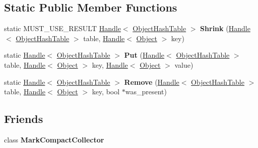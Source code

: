 \subsection*{Static Public Member Functions}
\begin{DoxyCompactItemize}
\item 
\hypertarget{classv8_1_1internal_1_1_object_hash_table_a63897a41f0ff1a796d4f136056a8af4b}{}static M\+U\+S\+T\+\_\+\+U\+S\+E\+\_\+\+R\+E\+S\+U\+L\+T \hyperlink{classv8_1_1internal_1_1_handle}{Handle}$<$ \hyperlink{classv8_1_1internal_1_1_object_hash_table}{Object\+Hash\+Table} $>$ {\bfseries Shrink} (\hyperlink{classv8_1_1internal_1_1_handle}{Handle}$<$ \hyperlink{classv8_1_1internal_1_1_object_hash_table}{Object\+Hash\+Table} $>$ table, \hyperlink{classv8_1_1internal_1_1_handle}{Handle}$<$ \hyperlink{classv8_1_1internal_1_1_object}{Object} $>$ key)\label{classv8_1_1internal_1_1_object_hash_table_a63897a41f0ff1a796d4f136056a8af4b}

\item 
\hypertarget{classv8_1_1internal_1_1_object_hash_table_ac9439aa9c8e36ffec62faea75de57535}{}static \hyperlink{classv8_1_1internal_1_1_handle}{Handle}$<$ \hyperlink{classv8_1_1internal_1_1_object_hash_table}{Object\+Hash\+Table} $>$ {\bfseries Put} (\hyperlink{classv8_1_1internal_1_1_handle}{Handle}$<$ \hyperlink{classv8_1_1internal_1_1_object_hash_table}{Object\+Hash\+Table} $>$ table, \hyperlink{classv8_1_1internal_1_1_handle}{Handle}$<$ \hyperlink{classv8_1_1internal_1_1_object}{Object} $>$ key, \hyperlink{classv8_1_1internal_1_1_handle}{Handle}$<$ \hyperlink{classv8_1_1internal_1_1_object}{Object} $>$ value)\label{classv8_1_1internal_1_1_object_hash_table_ac9439aa9c8e36ffec62faea75de57535}

\item 
\hypertarget{classv8_1_1internal_1_1_object_hash_table_a8a34606509a6db2ea1b8d548461152fb}{}static \hyperlink{classv8_1_1internal_1_1_handle}{Handle}$<$ \hyperlink{classv8_1_1internal_1_1_object_hash_table}{Object\+Hash\+Table} $>$ {\bfseries Remove} (\hyperlink{classv8_1_1internal_1_1_handle}{Handle}$<$ \hyperlink{classv8_1_1internal_1_1_object_hash_table}{Object\+Hash\+Table} $>$ table, \hyperlink{classv8_1_1internal_1_1_handle}{Handle}$<$ \hyperlink{classv8_1_1internal_1_1_object}{Object} $>$ key, bool $\ast$was\+\_\+present)\label{classv8_1_1internal_1_1_object_hash_table_a8a34606509a6db2ea1b8d548461152fb}

\end{DoxyCompactItemize}
\subsection*{Friends}
\begin{DoxyCompactItemize}
\item 
\hypertarget{classv8_1_1internal_1_1_object_hash_table_ae585a96455613b2bc2ae3ea75a061d8b}{}class {\bfseries Mark\+Compact\+Collector}\label{classv8_1_1internal_1_1_object_hash_table_ae585a96455613b2bc2ae3ea75a061d8b}

\end{DoxyCompactItemize}
